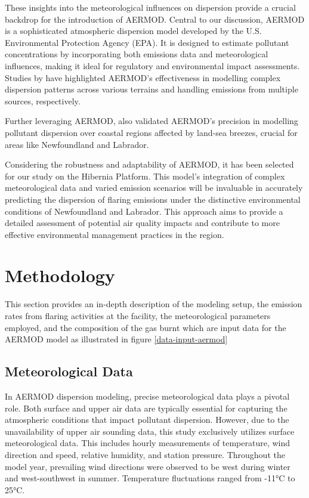 These insights into the meteorological influences on dispersion provide a crucial backdrop for the introduction of AERMOD. Central to our discussion, AERMOD is a sophisticated atmospheric dispersion model developed by the U.S. Environmental Protection Agency (EPA). It is designed to estimate pollutant concentrations by incorporating both emissions data and meteorological influences, making it ideal for regulatory and environmental impact assessments. Studies by \cite{cimorelli2005aermod,amoatey2019performance} have highlighted AERMOD's effectiveness in modelling complex dispersion patterns across various terrains and handling emissions from multiple sources, respectively.

Further leveraging AERMOD, \cite{afzali2017prediction} also validated AERMOD's precision in modelling pollutant dispersion over coastal regions affected by land-sea breezes, crucial for areas like Newfoundland and Labrador.

Considering the robustness and adaptability of AERMOD, it has been selected for our study on the Hibernia Platform. This model's integration of complex meteorological data and varied emission scenarios will be invaluable in accurately predicting the dispersion of flaring emissions under the distinctive environmental conditions of Newfoundland and Labrador. This approach aims to provide a detailed assessment of potential air quality impacts and contribute to more effective environmental management practices in the region.
\section{Methodology}
This section provides an in-depth description of the modeling setup, the emission rates from flaring activities at the facility, the meteorological parameters employed, and the composition of the gas burnt which are input data for the AERMOD model as illustrated in figure \ref{data-input-aermod}
\subsection{Meteorological Data}

In AERMOD dispersion modeling, precise meteorological data plays a pivotal role. Both surface and upper air data are typically essential for capturing the atmospheric conditions that impact pollutant dispersion. However, due to the unavailability of upper air sounding data, this study exclusively utilizes surface meteorological data. This includes hourly measurements of temperature, wind direction and speed, relative humidity, and station pressure. Throughout the model year, prevailing wind directions were observed to be west during winter and west-southwest in summer. Temperature fluctuations ranged from -11°C to 25°C.

